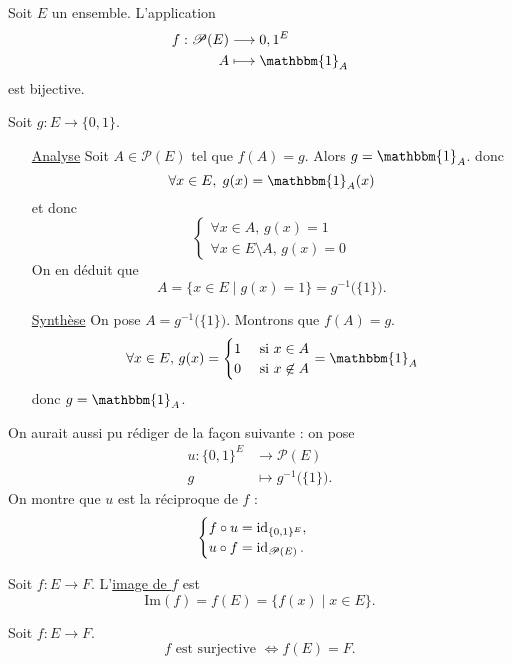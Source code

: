 \begin{exo}
	Soit $E$ un ensemble. L'application \begin{align*}
		f: \mathcal{P}(E) &\longrightarrow {0,1}^E \\
		A &\longmapsto \mathbbm{1}_A
	\end{align*} est bijective.

	Soit $g : E \to \{0,1\}$.
	\begin{itemize}
		\item[\underline{\sc Analyse}] Soit $A \in \mathcal{P}(E)$ tel que $f(A) = g$. Alors $g = \mathbbm{1}_A$.
			donc  \[
				\forall x \in E,\; g(x) = \mathbbm{1}_A(x)
			\] et donc \[
				\begin{cases}
					\forall x \in A,\, g(x) = 1\\
					\forall x \in E \setminus A,\,g(x) = 0
				\end{cases}
			\] On en déduit que \[
				A = \{ x \in E  \mid  g(x) = 1\}  = g^{-1}\big(\{1\}\big).
			\]
		\item[\underline{\sc Synthèse}] On pose $A = g^{-1}\big(\{1\}\big)$. Montrons que $f(A) = g$.
			\[
				\forall x \in E,\,g(x) = \begin{cases}
					1 &\text{ si } x \in A\\
					0 &\text{ si } x \not\in A
				\end{cases} = \mathbbm{1}_A
			\] donc $g = \mathbbm{1}_A$.
	\end{itemize}

	On aurait aussi pu rédiger de la fa\c con suivante : on pose \begin{align*}
		u: \{0,1\}^E &\longrightarrow \mathcal{P}(E) \\
		g &\longmapsto g^{-1}\big(\{1\}\big).
	\end{align*} On montre que $u$ est la réciproque de $f$ : \[
		\begin{cases}
			f \circ u = \operatorname{id}_{\{0,1\}^E},\\
			u \circ f = \operatorname{id}_{\mathcal{P}(E)}.
		\end{cases}
	\]
\end{exo}

\begin{defn}
	Soit $f : E \to F$. L'\underline{image de $f$} est \[
		\mathrm{Im}(f) = f(E) = \big\{f(x) \mid x \in E\big\}.
	\]
\end{defn}

\begin{prop}
	Soit $f: E \to F$. \[
		f \text{ est surjective } \iff f(E) = F.
	\]
\end{prop}

